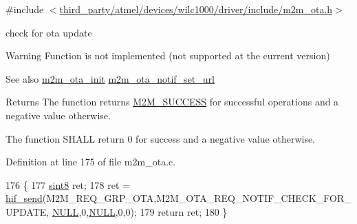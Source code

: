 {\ttfamily \#include $<$\hyperlink{m2m__ota_8h}{third\+\_\+party/atmel/devices/wilc1000/driver/include/m2m\+\_\+ota.\+h}$>$}



check for ota update 

\begin{DoxyWarning}{Warning}
Function is not implemented (not supported at the current version)
\end{DoxyWarning}
\begin{DoxySeeAlso}{See also}
\hyperlink{group__OtaInitFn_gacd2a1a8ffaccc3deb1970cf1ad41ceec}{m2m\+\_\+ota\+\_\+init} \hyperlink{group__OtaNotifStFn_ga98ab9f03996e6bf1cb21ba7259bb0058}{m2m\+\_\+ota\+\_\+notif\+\_\+set\+\_\+url} 
\end{DoxySeeAlso}
\begin{DoxyReturn}{Returns}
The function returns \hyperlink{nm__common_8h_a9ef27ba27aafdd1aa3a79d3ba2c36b8f}{M2\+M\+\_\+\+S\+U\+C\+C\+E\+SS} for successful operations and a negative value otherwise.

The function S\+H\+A\+LL return 0 for success and a negative value otherwise. 
\end{DoxyReturn}


Definition at line 175 of file m2m\+\_\+ota.\+c.


\begin{DoxyCode}
176 \{
177     \hyperlink{group__DataT_gae35f10ffd0ac8dd2bc3e794da9bdfbc7}{sint8} ret;
178     ret = \hyperlink{m2m__hif_8c_a13ba8ad11b2ac39516ca787386d16ce0}{hif\_send}(M2M\_REQ\_GRP\_OTA,M2M\_OTA\_REQ\_NOTIF\_CHECK\_FOR\_UPDATE,
      \hyperlink{group__BSPDefine_ga070d2ce7b6bb7e5c05602aa8c308d0c4}{NULL},0,\hyperlink{group__BSPDefine_ga070d2ce7b6bb7e5c05602aa8c308d0c4}{NULL},0,0);
179     \textcolor{keywordflow}{return} ret;
180 \}
\end{DoxyCode}
